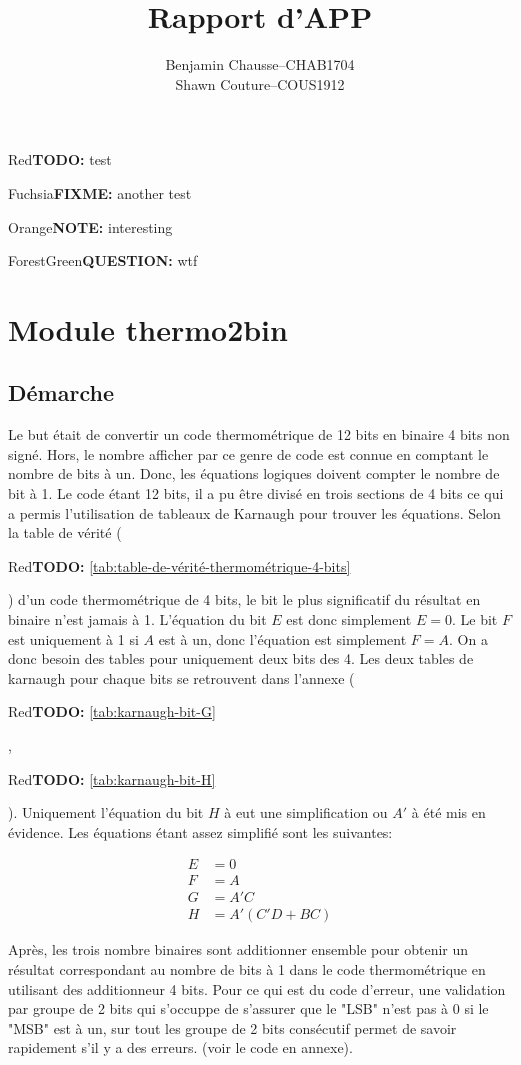 \documentclass[a11paper]{article}
\title{Rapport d'APP}
\author{
  \addtolength{\tabcolsep}{-0.4em}
  \begin{tabular}{rcl} %
      Benjamin Chausse & -- & CHAB1704 \\
      Shawn Couture    & -- & COUS1912 \\
  \end{tabular}
}
\newcommand{\todo}[1]{\begin{color}{Red}\textbf{TODO:} #1\end{color}}
\newcommand{\note}[1]{\begin{color}{Orange}\textbf{NOTE:} #1\end{color}}
\newcommand{\fixme}[1]{\begin{color}{Fuchsia}\textbf{FIXME:} #1\end{color}}
\newcommand{\question}[1]{\begin{color}{ForestGreen}\textbf{QUESTION:} #1\end{color}}
\begin{document}
\maketitle
\newpage
\tableofcontents
\newpage

\todo{test} \fixme{another test} \note{interesting} \question{wtf}

\section{Module thermo2bin}

\subsection{Démarche}
Le but était de convertir un code thermométrique de 12 bits en binaire 4 bits non signé. Hors, le nombre afficher par ce genre de code
est connue en comptant le nombre de bits à un. Donc, les équations logiques doivent compter le nombre de bit à 1. Le code étant 12 bits,
il a pu être divisé en trois sections de 4 bits ce qui a permis l'utilisation de tableaux de Karnaugh pour trouver les équations. Selon
la table de vérité (\todo{\ref{tab:table-de-vérité-thermométrique-4-bits}}) d'un code thermométrique de 4 bits, le bit le plus significatif
du résultat en binaire n'est jamais à 1. L'équation du bit $E$ est donc simplement $E=0$. Le bit $F$ est uniquement à 1 si $A$ est à un, donc
l'équation est simplement $F=A$. On a donc besoin des tables pour uniquement deux bits des 4. Les deux tables de karnaugh pour chaque bits
se retrouvent dans l'annexe (\todo{\ref{tab:karnaugh-bit-G}}, \todo{\ref{tab:karnaugh-bit-H}}). Uniquement l'équation du bit $H$ à eut une
simplification ou $A'$ à été mis en évidence. Les équations étant assez simplifié sont les suivantes:

\begin{align}
  E &= 0 \\ F &= A \\ G &= A'C \\ H &= A'(C'D+BC)
\end{align}

Après, les trois nombre binaires sont additionner ensemble pour obtenir un résultat correspondant au nombre de bits à 1 dans le code
thermométrique en utilisant des additionneur 4 bits. Pour ce qui est du code d'erreur, une validation par groupe de 2 bits qui s'occuppe
de s'assurer que le "LSB" n'est pas à 0 si le "MSB" est à un, sur tout les groupe de 2 bits consécutif permet de savoir rapidement s'il
y a des erreurs. (voir le code en annexe).
\end{document}
